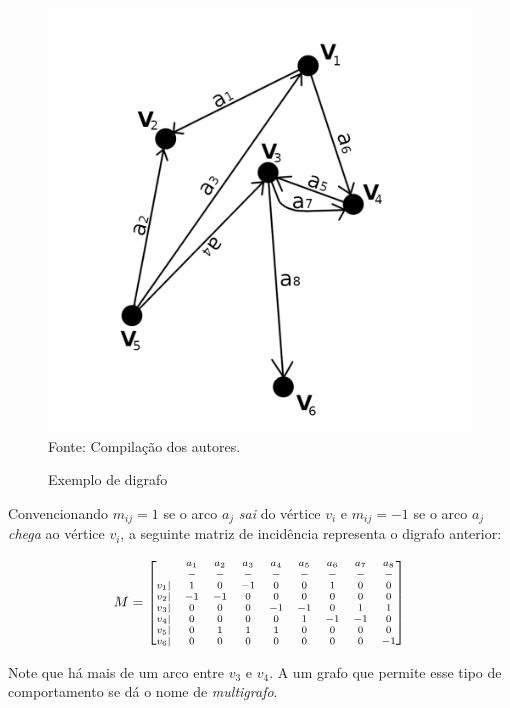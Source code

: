 \documentclass[twocolumn, 10pt]{extarticle}
\begin{document}
\begin{figure}[H]
	\caption{Exemplo de digrafo} 
	\centering
	\includegraphics[scale=0.7]{digrafo1}
	\\ Fonte: Compilação dos autores.
\end{figure}

Convencionando $m_{ij} = 1$ se o arco $a_j$ \textit{sai} do vértice $v_i$ e $m_{ij} = -1$ se o arco $a_j$ \textit{chega} ao vértice $v_i$, a seguinte matriz de incidência representa o digrafo anterior:

\[\scriptsize
M = 
\begin{bmatrix}
 & a_1 & a_2 & a_3 & a_4 & a_5 & a_6 & a_7 & a_8 \\
 & - & - & - & - & - & - & - & - \\
 v_1 |& 1 & 0 & -1 & 0 & 0 & 1 & 0 & 0\\
 v_2 |& -1 & -1 & 0 & 0 & 0 & 0 & 0 & 0\\
 v_3 |& 0 & 0 & 0 & -1 & -1 & 0 & 1 & 1\\
 v_4 |& 0 & 0 & 0 & 0 & 1 & -1 & -1 & 0\\
 v_5 |& 0 & 1 & 1 & 1 & 0 & 0 & 0 & 0\\
 v_6 |& 0 & 0 & 0 & 0 & 0 & 0 & 0 & -1
\end{bmatrix}
\]

Note que há mais de um arco entre $v_3$ e $v_4$. A um grafo que permite esse tipo de comportamento se dá o nome de \textit{multigrafo}. 
\end{document}
